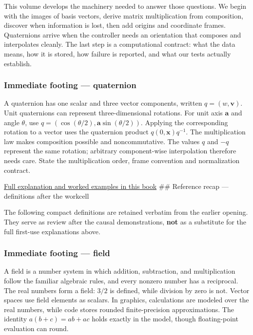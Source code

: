 This volume develops the machinery needed to answer those questions. We begin with the images of basis vectors, derive matrix multiplication from composition, discover when information is lost, then add origins and coordinate frames. Quaternions arrive when the controller needs an orientation that composes and interpolates cleanly. The last step is a computational contract: what the data means, how it is stored, how failure is reported, and what our tests actually establish.

\subsubsection{Immediate footing --- quaternion}\label{01-foundations-i-ch018-immediate-footing-quaternion}

\hypertarget{01-foundations-i-ch018-immediate-footing-quaternion}{}

A quaternion has one scalar and three vector components, written \(q=(w,\mathbf v)\). Unit quaternions can represent three-dimensional rotations. For unit axis \(\mathbf a\) and angle \(\theta\), use \(q=(\cos(\theta/2),\mathbf a\sin(\theta/2))\). Applying the corresponding rotation to a vector uses the quaternion product \(q(0,\mathbf x)q^{-1}\). The multiplication law makes composition possible and noncommutative. The values \(q\) and \(-q\) represent the same rotation; arbitrary component-wise interpolation therefore needs care. State the multiplication order, frame convention and normalization contract.

\hyperref[01-foundations-i-ch019-orientation-needs-a-state-that-can-be-composed]{Full explanation and worked examples in this book} \#\# Reference recap --- definitions after the workcell

The following compact definitions are retained verbatim from the earlier opening. They serve as review after the causal demonstrations, \textbf{not} as a substitute for the full first-use explanations above.

\subsubsection{Immediate footing --- field}\label{01-foundations-i-ch018-immediate-footing-field}

\hypertarget{01-foundations-i-ch018-immediate-footing-field}{}

A field is a number system in which addition, subtraction, and multiplication follow the familiar algebraic rules, and every nonzero number has a reciprocal. The real numbers form a field: \(3/2\) is defined, while division by zero is not. Vector spaces use field elements as scalars. In graphics, calculations are modeled over the real numbers, while code stores rounded finite-precision approximations. The identity \(a(b+c)=ab+ac\) holds exactly in the model, though floating-point evaluation can round.

